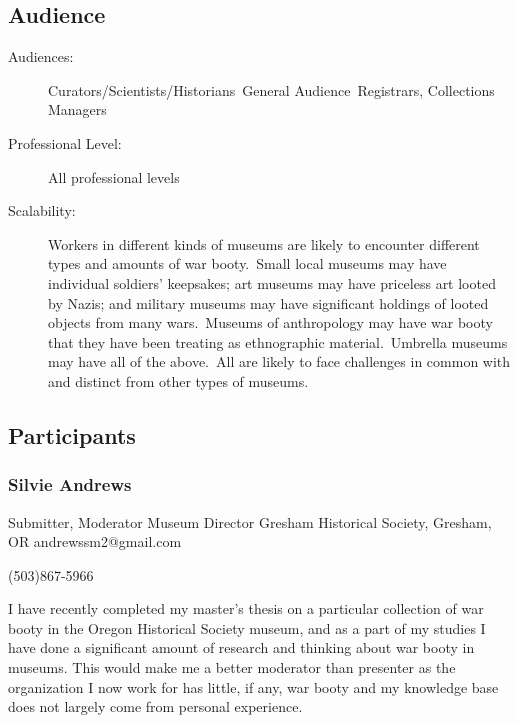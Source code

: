 \documentclass{report}
\begin{document}
              \subsection*{Audience}
                \begin{description}
                  \item [Audiences:]Curators/Scientists/Historians~General Audience~Registrars, Collections Managers~
                  \item[Professional Level:]All professional levels~
                \item[Scalability:] Workers in different kinds of museums are likely to encounter different types and amounts of war booty. Small local museums may have individual soldiers’ keepsakes; art museums may have priceless art looted by Nazis; and military museums may have significant holdings of looted objects from many wars. Museums of anthropology may have war booty that they have been treating as ethnographic material. Umbrella museums may have all of the above. All are likely to face challenges in common with and distinct from other types of museums.

							
              \end{description}
            \subsection*{Participants}
              \subsubsection*{ Silvie Andrews }
              Submitter, Moderator\newline
              Museum Director\newline
              Gresham Historical Society, Gresham, OR
              \newline
              andrewssm2@gmail.com\newline
              
              (503)867-5966\newline

              I have recently completed my master’s thesis on a particular collection of war booty in the Oregon Historical Society museum, and as a part of my studies I have done a significant amount of research and thinking about war booty in museums. This would make me a better moderator than presenter as the organization I now work for has little, if any, war booty and my knowledge base does not largely come from personal experience.\newline
\end{document}
